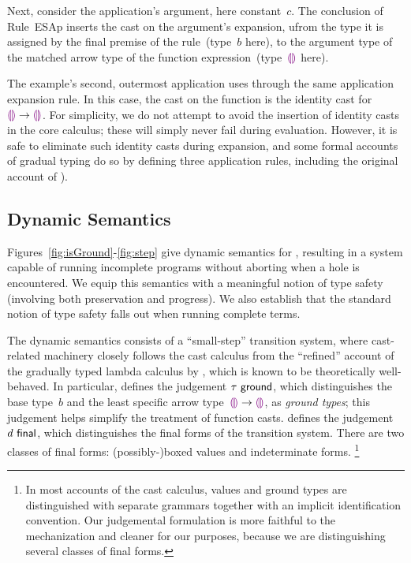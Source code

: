 Next, consider the application's argument, here constant~$c$.
%
The conclusion of Rule~{ESAp} inserts the cast on the argument's
expansion, ufrom the type it is assigned by the final premise of the
rule~(type~$b$ here), to the argument type of the matched arrow type
of the function expression~(type~$\textcolor{violet}{\llparenthesis}\textcolor{violet}{\rrparenthesis}$ here).

The example's second, outermost application uses through the same
application expansion rule.
%
In this case, the cast on the function is the identity cast for
$\textcolor{violet}{\llparenthesis}\textcolor{violet}{\rrparenthesis} \rightarrow \textcolor{violet}{\llparenthesis}\textcolor{violet}{\rrparenthesis}$.
%
For simplicity, we do not attempt to avoid the insertion of identity
casts in the core calculus; these will simply never fail during
evaluation.
%
However, it is safe to eliminate such identity casts during expansion,
and some formal accounts of gradual typing do so by defining three
application rules, including the original account of \cite{Siek06a}).

\subsection{Dynamic Semantics}
\label{sec:evaluation}

Figures~\ref{fig:isGround}-\ref{fig:step} give dynamic semantics for \HazelnutLive,
%
resulting in a system capable of running incomplete programs without aborting when a hole is encountered.
%
We equip this semantics with a meaningful notion of type safety (involving both preservation and progress).
%
We also establish that the standard notion of type safety falls out when running complete terms.


The dynamic semantics consists of a ``small-step'' transition system,
%
where cast-related machinery closely follows the cast calculus from
the ``refined'' account of the gradually typed lambda calculus
by \citet{DBLP:conf/snapl/SiekVCB15}, which is known to be
theoretically well-behaved.
%
In particular,  defines the judgement
$\tau~\mathsf{ground}$, which distinguishes the base type~$b$ and the
least specific arrow type~$\textcolor{violet}{\llparenthesis}\textcolor{violet}{\rrparenthesis} \rightarrow \textcolor{violet}{\llparenthesis}\textcolor{violet}{\rrparenthesis}$, as \emph{ground
types}; this judgement helps simplify the treatment of function casts.
%
 defines the judgement $d~\mathsf{final}$, which
distinguishes the final forms of the transition system.
%
There are two classes of final forms: (possibly-)boxed values and
indeterminate forms.%
%
\footnote{
        In most accounts of the cast calculus, values and ground types
        are distinguished with separate grammars together with an
        implicit identification convention.
        Our judgemental formulation is more faithful to the mechanization and
        cleaner for our purposes, because we are distinguishing several
        classes of final forms.
}

